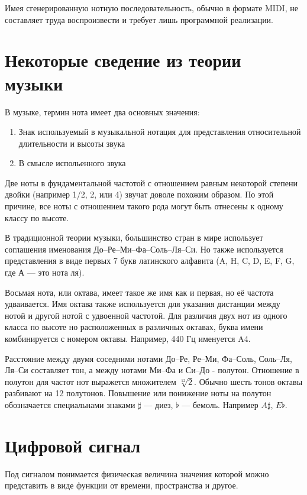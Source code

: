 \documentclass[oneside, final, 14pt]{extarticle}
\begin{document}
	Имея сгенерированную нотную последовательность, обычно в формате MIDI, не составляет
	труда воспроизвести и требует лишь программной реализации.
\cleardoublepage

\section{Некоторые сведение из теории музыки}

	В музыке, термин нота имеет два основных значения:

	\begin{enumerate}
		\item Знак используемый в музыкальной нотация для представления
			относительной длительности и высоты звука
		\item В смысле испольенного звука
	\end{enumerate}

	Две ноты в фундаментальной частотой с отношением равным некоторой
	степени двойки (например 1/2, 2, или 4) звучат доволе похожим
	образом. По этой причине, все ноты с отношением такого рода могут
	быть отнесены к одному классу по высоте.

	В традиционной теории музыки, большинство стран в мире использует
	соглашения именования До--Ре--Ми--Фа--Соль--Ля--Си. Но также используется
	представления в виде первых 7 букв латинского алфавита (A, H, C, D,
	E, F, G, где А --- это нота ля).

	Восьмая нота, или октава, имеет такое же имя как и первая, но её частота
	удваивается. Имя октава также используется для указания дистанции между
	нотой и другой нотой с удвоенной частотой. Для различия двух нот из одного
	класса по высоте но расположенных в различных октавах, буква имени
	комбинируется с номером октавы. Например, 440 Гц именуется A4.

	Расстояние между двумя соседними нотами До--Ре, Ре--Ми, Фа--Соль, Соль--Ля,
	Ля--Си составляет тон, а между нотами Ми--Фа и Си--До - полутон. Отношение
	в полутон для частот нот выражется множителем $\sqrt[12]{2}$. Обычно
	шесть тонов октавы разбивают на 12 полутонов. Повышение или понижение
	ноты на полутон обозначается специальнами знаками $\sharp$ --- диез,
	$\flat$ --- бемоль. Например $A\sharp$, $E\flat$.

\cleardoublepage
\section{Цифровой сигнал}
	Под сигналом понимается физическая величина значения которой можно представить в виде функции от времени, пространства
	и другое.
\end{document}
